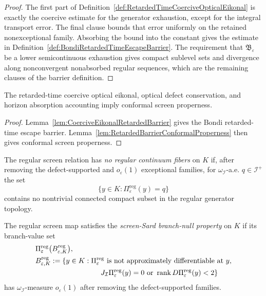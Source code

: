 \begin{proof}
The first part of Definition~\ref{def:RetardedTimeCoerciveOpticalEikonal} is exactly the coercive estimate for the generator exhaustion, except for the integral transport error. The final clause bounds that error uniformly on the retained nonexceptional family. Absorbing the bound into the constant gives the estimate in Definition~\ref{def:BondiRetardedTimeEscapeBarrier}. The requirement that $\mathfrak B_\varepsilon$ be a lower semicontinuous exhaustion gives compact sublevel sets and divergence along nonconvergent nonabsorbed regular sequences, which are the remaining clauses of the barrier definition.
\end{proof}

\begin{theorem}\label{thm:RetardedTimeConformalProperness}
The retarded-time coercive optical eikonal, optical defect conservation, and horizon absorption accounting imply conformal screen properness.
\end{theorem}

\begin{proof}
Lemma~\ref{lem:CoerciveEikonalRetardedBarrier} gives the Bondi retarded-time escape barrier. Lemma~\ref{lem:RetardedBarrierConformalProperness} then gives conformal screen properness.
\end{proof}

\begin{definition}\label{def:NoRegularContinuumFibers}
The regular screen relation has \emph{no regular continuum fibers} on $K$ if, after removing the defect-supported and $o_\varepsilon(1)$ exceptional families, for $\omega_{\mathscr I}$-a.e. $q\in\mathscr I^+$ the set
\[
    \{y\in K:\Pi_{\varepsilon}^{\mathrm{reg}}(y)=q\}
\]
contains no nontrivial connected compact subset in the regular generator topology.
\end{definition}

\begin{definition}\label{def:ScreenSardBranchNull}
The regular screen map satisfies the \emph{screen-Sard branch-null property} on $K$ if its branch-value set
\[
\begin{aligned}
    &\Pi_{\varepsilon}^{\mathrm{reg}}
    \bigl(B_{\varepsilon,K}^{\mathrm{reg}}\bigr),\\
    &B_{\varepsilon,K}^{\mathrm{reg}}
    :=
    \{y\in K:\Pi_{\varepsilon}^{\mathrm{reg}}\text{ is not approximately differentiable at }y,\\
    &\hspace{3.2cm}
    J_{\mathscr I}\Pi_{\varepsilon}^{\mathrm{reg}}(y)=0
    \text{ or } \operatorname{rank}D\Pi_{\varepsilon}^{\mathrm{reg}}(y)<2\}
\end{aligned}
\]
has $\omega_{\mathscr I}$-measure $o_\varepsilon(1)$ after removing the defect-supported families.
\end{definition}

